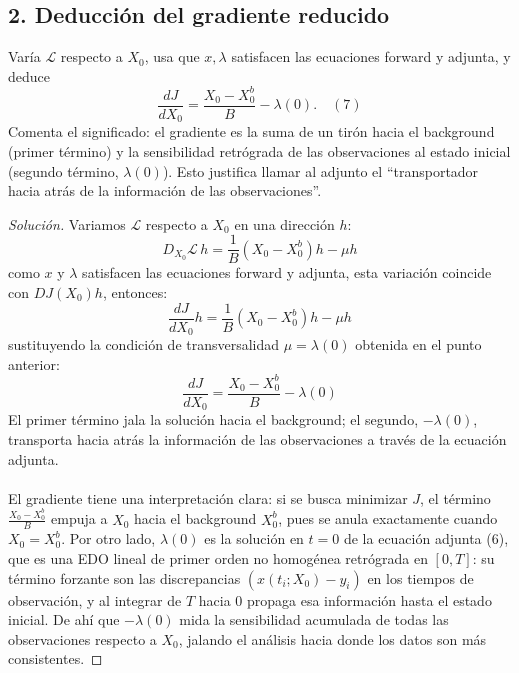 \documentclass[12pt,spanish,mexico]{article}
\numberwithin{equation}{section}
\theoremstyle{definition}
\theoremstyle{remark}
\newenvironment{solution}{\begin{proof}[Solución]}{\end{proof}}
\begin{document}
\subsection{2. Deducción del gradiente reducido}
Varía \(\mathcal{L}\) respecto a \(X_0\), usa que \(x, \lambda\) satisfacen las ecuaciones forward y adjunta, y deduce
\[
\frac{dJ}{dX_0} = \frac{X_0 - X_0^b}{B} - \lambda(0). \quad (7)
\]
Comenta el significado: el gradiente es la suma de un tirón hacia el background (primer término) y la sensibilidad retrógrada de las observaciones al estado inicial (segundo término, \(\lambda(0)\)). Esto justifica llamar al adjunto el “transportador hacia atrás de la información de las observaciones”.

\begin{solution}
Variamos $\mathcal{L}$ respecto a $X_0$ en una dirección $h$:
\[
D_{X_0} \mathcal{L}\, h = \frac{1}{B}(X_0 - X_0^b)h - \mu h
\]
como $x$ y $\lambda$ satisfacen las ecuaciones forward y adjunta, esta variación coincide con $DJ(X_0)h$, entonces:
\[
\frac{dJ}{dX_0} h= \frac{1}{B}(X_0 - X_0^b)h - \mu h
\]
sustituyendo la condición de transversalidad $\mu = \lambda(0)$ obtenida en el punto anterior:
\[
\boxed{\frac{dJ}{dX_0} = \frac{X_0 - X_0^b}{B} - \lambda(0)}
\]
El primer término jala la solución hacia el background; el segundo, $-\lambda(0)$, transporta hacia atrás la información de las observaciones a través de la ecuación adjunta.
\\
\\
El gradiente tiene una interpretación clara: si se busca minimizar $J$, el término 
$\frac{X_0 - X_0^b}{B}$ empuja a $X_0$ hacia el background $X_0^b$, pues se anula 
exactamente cuando $X_0 = X_0^b$. Por otro lado, $\lambda(0)$ es la solución en $t=0$ 
de la ecuación adjunta (6), que es una EDO lineal de primer orden no homogénea retrógrada 
en $[0,T]$: su término forzante son las discrepancias $(x(t_i;X_0)-y_i)$ en los tiempos 
de observación, y al integrar de $T$ hacia $0$ propaga esa información hasta el estado 
inicial. De ahí que $-\lambda(0)$ mida la sensibilidad acumulada de todas las observaciones 
respecto a $X_0$, jalando el análisis hacia donde los datos son más consistentes.

\end{solution}
\end{document}
